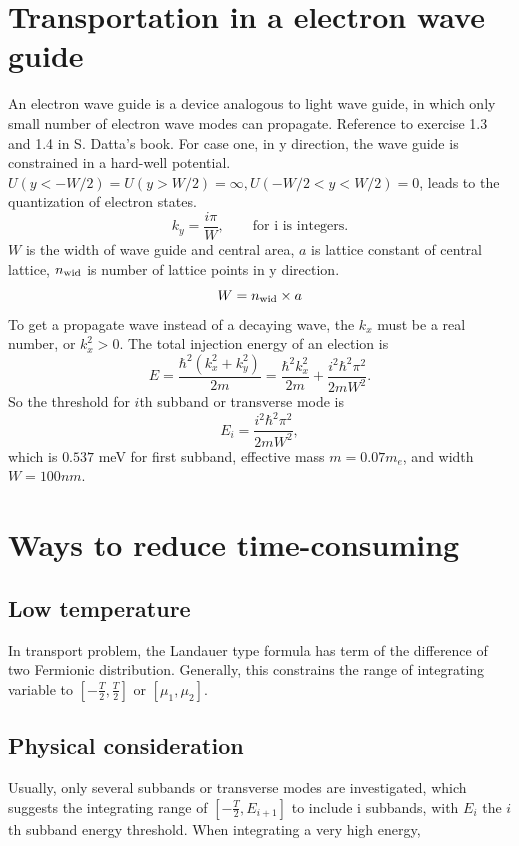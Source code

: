 \documentclass[aps,prb,onecolumn,amssymb,amsmath,superscriptaddress]{revtex4-1}
\begin{document}
\section{Transportation in a electron wave guide}
An electron wave guide is a device analogous to light wave guide, in which only small number of electron wave modes can propagate. Reference to exercise 1.3 and 1.4 in S. Datta's book. For case one, in y direction, the wave guide is constrained in a hard-well potential. $U(y < -W/2) = U(y > W/2) = \infty, U(-W/2 < y < W/2) = 0$, leads to the quantization of electron states.
\begin{equation}
k_{y} = \frac{i\pi}{W}, \qquad \text{for i is integers.}
\end{equation}
$W$ is the width of wave guide and central area, $a$ is lattice constant of central lattice, $n_{\rm{wid}}$ is number of lattice points in y direction.
\begin{equation}
W = n_{\rm{wid}}\times a
\end{equation}
To get a propagate wave instead of a decaying wave, the $k_{x}$ must be a real number, or $k_{x}^{2} > 0$. The total injection energy of an election is
\begin{equation}
E = \frac{\hbar^{2} (k_{x}^{2}+k_{y}^{2})}{2m} = \frac{\hbar^{2} k_{x}^{2}}{2m} + \frac{i^{2}\hbar^{2} \pi^{2}}{2mW^{2}}.
\end{equation}
So the threshold for $i$th subband or transverse mode is
\begin{equation}
E_{i} = \frac{i^{2}\hbar^{2} \pi^{2}}{2mW^{2}},
\end{equation}
which is $0.537$ meV for first subband, effective mass $m=0.07m_{e}$, and width $W = 100nm$.
\section{Ways to reduce time-consuming}
\subsection{Low temperature}
In transport problem, the Landauer type formula has term of the difference of two Fermionic distribution. Generally, this constrains the range of integrating variable to $[-\frac{T}{2}, \frac{T}{2}]$ or $[\mu_{1}, \mu_{2}]$.
\subsection{Physical consideration}
Usually, only several subbands or transverse modes are investigated, which suggests the integrating range of $[-\frac{T}{2}, E_{i+1}]$ to include i subbands, with $E_i$ the $i$th subband energy threshold. When integrating a very high energy, 
\end{document}
